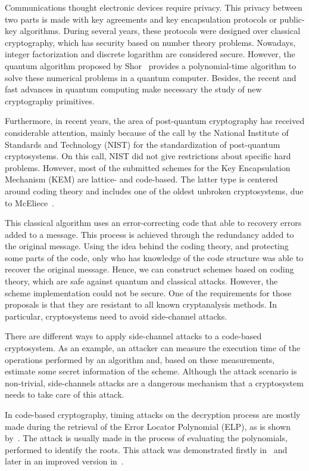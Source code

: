 Communications thought electronic devices require privacy. This privacy between two parts is made with key agreements and key encapsulation protocols or public-key algorithms. During several years, these protocols were designed over classical cryptography, which has security based on number theory problems. Nowadays, integer factorization and discrete logarithm are considered secure. However, the quantum algorithm proposed by Shor~\cite{shor1999polynomial} provides a polynomial-time algorithm to solve these numerical problems in a quantum computer. Besides, the recent and fast advances in quantum computing make necessary the study of new cryptography primitives. 

Furthermore, in recent years, the area of post-quantum cryptography has received considerable attention, mainly because of the call by the National Institute of Standards and Technology (NIST) for the standardization of post-quantum cryptosystems. On this call, NIST did not give restrictions about specific hard problems. However, most of the submitted schemes for the Key Encapsulation Mechanism (KEM) are lattice- and code-based. The latter type is centered around coding theory and includes one of the oldest unbroken cryptosystems, due to McEliece~\cite{mceliece1978public}.

This classical algorithm uses an error-correcting code that able to recovery errors added to a message. This process is achieved through the redundancy added to the original message. Using the idea behind the coding theory, and protecting some parts of the code, only who has knowledge of the code structure was able to recover the original message. Hence, we can construct schemes based on coding theory, which are safe against quantum and classical attacks. However, the scheme implementation could not be secure. One of the requirements for those proposals is that they are resistant to all known cryptanalysis methods. In particular, cryptosystems need to avoid side-channel attacks.

There are different ways to apply side-channel attacks to a code-based cryptosystem. As an example, an attacker can measure the execution time of the operations performed by an algorithm and, based on these measurements, estimate some secret information of the scheme. Although the attack scenario is non-trivial, side-channels attacks are a dangerous mechanism that a cryptosystem needs to take care of this attack.
 
In code-based cryptography, timing attacks on the decryption process are mostly made during the retrieval of the Error Locator Polynomial (ELP), as is shown by~\cite{shoufan2009timing}. The attack is usually made in the process of evaluating the polynomials, performed to identify the roots. This attack was demonstrated firstly in~\cite{shoufan2009timing} and later in an improved version in~\cite{bucerzan2017improved}.

